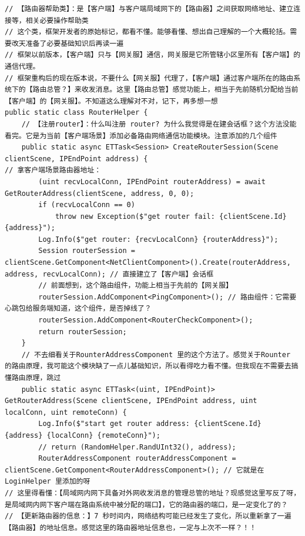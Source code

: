 \documentclass[9pt, b5paper]{article}
\begin{document}
\begin{verbatim}
// 【路由器帮助类】：是【客户端】与客户端局域网下的【路由器】之间获取网络地址、建立连接等，相关必要操作帮助类
// 这个类，框架开发者的原始标记，都看不懂。能够看懂、想出自己理解的一个大概轮括。需要改天准备了必要基础知识后再读一遍
// 框架以前版本，【客户端】只与【网关服】通信，网关服是它所管辖小区里所有【客户端】的通信代理。
// 框架重构后的现在版本说，不要什么【网关服】代理了，【客户端】通过客户端所在的路由系统下的【路由总管？】来收发消息。这里【路由总管】感觉功能上，相当于先前随机分配给当前【客户端】的【网关服】。不知道这么理解对不对，记下，再多想一想
public static class RouterHelper {
    // 【注册router】：什么叫注册 router? 为什么我觉得是在建会话框？这个方法没能看完。它是为当前【客户端场景】添加必备路由网络通信功能模块。注意添加的几个组件
    public static async ETTask<Session> CreateRouterSession(Scene clientScene, IPEndPoint address) {
// 拿客户端场景路由器地址：
        (uint recvLocalConn, IPEndPoint routerAddress) = await GetRouterAddress(clientScene, address, 0, 0); 
        if (recvLocalConn == 0) 
            throw new Exception($"get router fail: {clientScene.Id} {address}");
        Log.Info($"get router: {recvLocalConn} {routerAddress}");
        Session routerSession = clientScene.GetComponent<NetClientComponent>().Create(routerAddress, address, recvLocalConn); // 直接建立了【客户端】会话框
        // 前面想到，这个路由组件，功能上相当于先前的【网关服】
        routerSession.AddComponent<PingComponent>(); // 路由组件：它需要心跳包给服务端知道，这个组件，是否掉线了？
        routerSession.AddComponent<RouterCheckComponent>(); 
        return routerSession;
    }
    // 不去细看关于RounterAddressComponent 里的这个方法了。感觉关于Rounter 的路由原理，我可能这个模块缺了一点儿基础知识，所以看得吃力看不懂。但我现在不需要去搞懂路由原理，跳过
    public static async ETTask<(uint, IPEndPoint)> GetRouterAddress(Scene clientScene, IPEndPoint address, uint localConn, uint remoteConn) {
        Log.Info($"start get router address: {clientScene.Id} {address} {localConn} {remoteConn}");
        // return (RandomHelper.RandUInt32(), address);
        RouterAddressComponent routerAddressComponent = clientScene.GetComponent<RouterAddressComponent>(); // 它就是在 LoginHelper 里添加的呀
// 这里得看懂：【局域网内网下具备对外网收发消息的管理总管的地址？现感觉这里写反了呀，是局域网内网下客户端在路由系统中被分配的端口】，它的路由器的端口，是一定变化了的？
// 【更新路由器的信息：】7 秒时间内，网络结构可能已经发生了变化，所以重新拿了一遍【路由器】的地址信息。感觉这里的路由器地址信息也，一定与上次不一样？！！

\end{verbatim}
\end{document}
